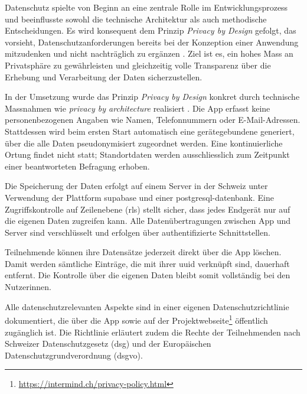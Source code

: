 Datenschutz spielte von Beginn an eine zentrale Rolle im Entwicklungsprozess und beeinflusste sowohl die technische Architektur als auch methodische Entscheidungen. Es wird konsequent dem Prinzip \textit{Privacy by Design} gefolgt, das vorsieht, Datenschutzanforderungen bereits bei der Konzeption einer Anwendung mitzudenken und nicht nachträglich zu ergänzen \parencite{cavoukianPrivacyDesign72009}. Ziel ist es, ein hohes Mass an Privatsphäre zu gewährleisten und gleichzeitig volle Transparenz über die Erhebung und Verarbeitung der Daten sicherzustellen.

In der Umsetzung wurde das Prinzip \textit{Privacy by Design} konkret durch technische Massnahmen wie \textit{privacy by architecture} realisiert \parencite{spiekermannEngineeringPrivacy2009}. Die App erfasst keine personenbezogenen Angaben wie Namen, Telefonnummern oder E-Mail-Adressen. Stattdessen wird beim ersten Start automatisch eine gerätegebundene  generiert, über die alle Daten pseudonymisiert zugeordnet werden. Eine kontinuierliche Ortung findet nicht statt; Standortdaten werden ausschliesslich zum Zeitpunkt einer beantworteten Befragung erhoben.


Die Speicherung der Daten erfolgt auf einem Server in der Schweiz unter Verwendung der Plattform \gls{supabase} und einer \gls{postgresql}-\gls{datenbank}. Eine Zugriffskontrolle auf Zeilenebene (\gls{rls}) stellt sicher, dass jedes Endgerät nur auf die eigenen Daten zugreifen kann. Alle Datenübertragungen zwischen App und Server sind verschlüsselt und erfolgen über authentifizierte Schnittstellen.

Teilnehmende können ihre Datensätze jederzeit direkt über die App löschen. Damit werden sämtliche Einträge, die mit ihrer \gls{uuid} verknüpft sind, dauerhaft entfernt. Die Kontrolle über die eigenen Daten bleibt somit vollständig bei den Nutzer\genderstern innen.

Alle datenschutzrelevanten Aspekte sind in einer eigenen Datenschutzrichtlinie dokumentiert, die über die App sowie auf der Projektwebseite\footnote{\href{https://intermind.ch/privacy-policy.html}{https://intermind.ch/privacy-policy.html}} öffentlich zugänglich ist. Die Richtlinie erläutert zudem die Rechte der Teilnehmenden nach Schweizer Datenschutzgesetz (\gls{dsg}) und der Europäischen Datenschutzgrundverordnung (\gls{dsgvo}).

\vspace{1em}

